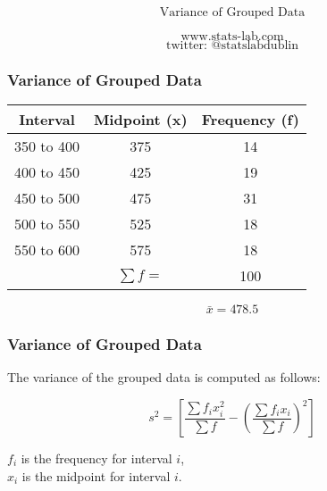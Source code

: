 \documentclass[slidemain.tex]{subfiles}
\begin{document}
 

\begin{frame}

{
\Huge
\[\mbox{Variance of Grouped Data} \]
}
{
\Large

\[\mbox{www.stats-lab.com} \]
\[ \mbox{twitter: @statslabdublin} \] 

}
\end{frame}
\begin{frame}
\frametitle{Variance of Grouped Data}
{
\begin{center}
\Large

\begin{tabular}{|c|c|c|}
\hline Interval & Midpoint (x) & Frequency (f) \\ 
\hline \hline 350 to 400 & 375 & 14 \\ 
\hline 400 to 450 & 425  & 19 \\ 
\hline 450 to 500 & 475 & 31 \\ 
\hline 500 to 550 & 525 & 18 \\ 
\hline 550 to 600 & 575 &  18\\ \hline
\hline  &  $\sum f = $& 100  \\ 
\hline 
\end{tabular} 

\[ \bar{x} = 478.5 \]
\end{center}

}

\end{frame}
\begin{frame}
\frametitle{Variance of Grouped Data}
{
\LARGE
The variance of the grouped data is computed as follows:

\[ s^2 = \left[ \frac{\sum f_ix_i^2}{\sum f} - \left(\frac{\sum f_ix_i}{\sum f}\right)^2 \right] \]
\bigskip

$f_i$ is the frequency for interval $i$,\\
$x_i$ is the midpoint for interval $i$.

}

\end{frame}
\end{document}
